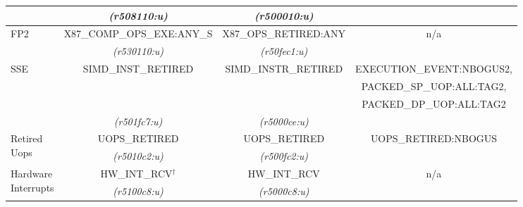 \begin{tabular}{|l||c|c|c|}
                      &
{\em (r508110:u)}     & %
{\em (r500010:u)}     & %
			\\ %

\hline
\multirow{2}{*}{\parbox{0.5in}{FP2}}     &  
X87\_COMP\_OPS\_EXE:ANY\_S   & %
X87\_OPS\_RETIRED:ANY        & %
\multirow{2}{*}{n/a}         \\ %


                      &
{\em (r530110:u)}     & %
{\em (r50fec1:u)}     & %
			\\ %


\hline
\multirow{4}{*}{\parbox{0.5in}{SSE}}   &  
\multirow{3}{*}{SIMD\_INST\_RETIRED}    & %
\multirow{3}{*}{SIMD\_INSTR\_RETIRED}   & %
EXECUTION\_EVENT:NBOGUS2,            \\ %

               &  
               & %
               & %
PACKED\_SP\_UOP:ALL:TAG2,  \\ %

               &  
               & %
               & %
PACKED\_DP\_UOP:ALL:TAG2  \\ %

                      &
{\em (r501fc7:u)}     & %
{\em (r5000ce:u)}     & %
			\\ %



\hline
\multirow{2}{*}{\parbox{0.5in}{Retired\\
Uops}}   &
UOPS\_RETIRED         & %
UOPS\_RETIRED         & %
UOPS\_RETIRED:NBOGUS  \\ %

                  &
{\em (r5010c2:u)}     & %
{\em (r500fc2:u)}     & %
			\\ %

\hline
\multirow{2}{*}{\parbox{0.5in}{Hardware\\
Interrupts}}                 &
HW\_INT\_RCV$^{\dagger}$ & %
HW\_INT\_RCV             & %
\multirow{2}{*}{n/a}     \\ %

                      &
{\em (r5100c8:u)}     & %
{\em (r5000c8:u)}     & %
			\\ %

\hline

\end{tabular}

